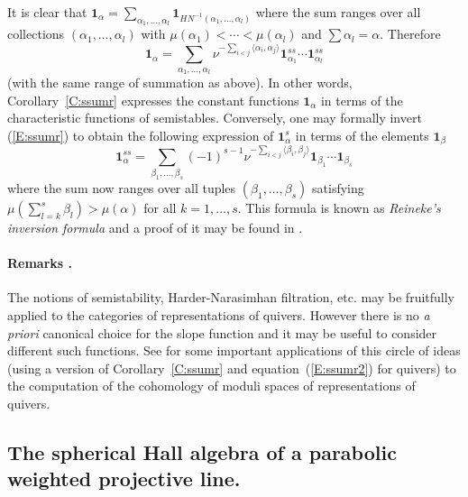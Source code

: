 \documentclass[a4paper,10pt]{amsart}
\def\a{\alpha}
\numberwithin{equation}{section}
\begin{document}
{It is clear that $\mathbf{1}_{\a}=\sum_{\a_1, \ldots, \a_l} \mathbf{1}_{HN^{-1}(\a_1, \ldots, \a_l)}$ where the sum ranges over all
collections $(\a_1, \ldots, \a_l)$ with $\mu(\a_1) < \cdots < \mu(\a_l)$ and $\sum \a_l=\a$. Therefore
\begin{equation}\label{E:ssumr}
\mathbf{1}_{\a}=\sum_{\a_1, \ldots, \a_l} \nu^{-\sum_{i<j} \langle \a_i, \a_j\rangle}\mathbf{1}^{ss}_{\a_1} \cdots \mathbf{1}^{ss}_{\a_l}
\end{equation}
(with the same range of summation as above). In other words, Corollary~\ref{C:ssumr} expresses the constant functions $\mathbf{1}_{\a}$ in terms of the
characteristic functions of semistables. Conversely, one may formally invert (\ref{E:ssumr}) to obtain the following expression of $\mathbf{1}^{s}_{\a}$ in terms of the elements
$\mathbf{1}_{\beta}$
\begin{equation}\label{E:ssumr2}
\mathbf{1}^{ss}_{\a}=\sum_{\beta_1, \ldots, \beta_s}(-1)^{s-1} \nu^{-\sum_{i<j} \langle \beta_i, \beta_j\rangle}\mathbf{1}_{\beta_1} \cdots \mathbf{1}_{\beta_s}
\end{equation}
where the sum now ranges over all tuples $(\beta_1, \ldots, \beta_s)$ satisfying $\mu(\sum_{l=k}^s \beta_l) > \mu(\a)$ for all $k=1, \ldots, s$.
This formula is known as \textit{Reineke's inversion formula} and a proof of it may be found in \cite{Reinekeinv}.

\vspace{.15in}

\addtocounter{theo}{1}
\paragraph{\textbf{Remarks \thetheo.}} The notions of semistability, Harder-Narasimhan filtration, etc. may be fruitfully applied to the categories of representations of quivers. However there is no \textit{a priori} canonical choice for the slope function and it may be useful to consider different such functions. See \cite{Reinekeinv} for some important applications of this circle of ideas (using a version of Corollary~\ref{C:ssumr} and equation~(\ref{E:ssumr2}) for quivers) to the computation of the cohomology of moduli spaces of representations of quivers.


\vspace{.2in}

\subsection{The spherical Hall algebra of a parabolic weighted projective line.}

}
\end{document}
